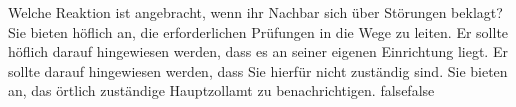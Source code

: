     {Welche Reaktion ist angebracht, wenn ihr Nachbar sich über Störungen beklagt?}
    {Sie bieten höflich an, die erforderlichen Prüfungen in die Wege zu leiten.}
    {Er sollte höflich darauf hingewiesen werden, dass es an seiner eigenen Einrichtung liegt.}
    {Er sollte darauf hingewiesen werden, dass Sie hierfür nicht zuständig sind.}
    {Sie bieten an, das örtlich zuständige Hauptzollamt zu benachrichtigen.}
    {false}{false}